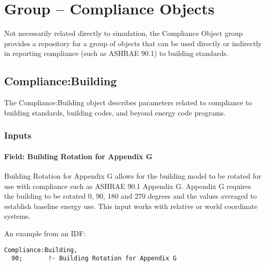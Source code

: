 \section{Group -- Compliance Objects}\label{group-compliance-objects}

Not necessarily related directly to simulation, the Compliance Object group provides a repository for a group of objects that can be used directly or indirectly in reporting compliance (such as ASHRAE 90.1) to building standards.

\subsection{Compliance:Building}\label{compliancebuilding}

The Compliance:Building object describes parameters related to compliance to building standards, building codes, and beyond energy code programs.

\subsubsection{Inputs}\label{inputs-006}

\paragraph{Field: Building Rotation for Appendix G}\label{field-building-rotation-for-appendix-g}

Building Rotation for Appendix G allows for the building model to be rotated for use with compliance such as ASHRAE 90.1 Appendix G. Appendix G requires the building to be rotated 0, 90, 180 and 270 degrees and the values averaged to establish baseline energy use. This input works with relative or world coordinate systems.

An example from an IDF:

\begin{lstlisting}
Compliance:Building,
  90;       !- Building Rotation for Appendix G
\end{lstlisting}

